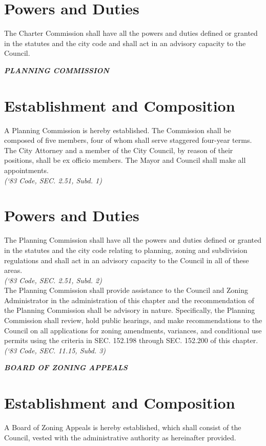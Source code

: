 \section{Powers and Duties}
The Charter Commission shall have all the powers and duties defined or granted in the statutes and the city code and shall act in an advisory capacity to the Council.\\

\centerline{\textbf{\emph{\LARGE{PLANNING COMMISSION}}}}
\setcounter{section}{119}
\section{Establishment and Composition}
A Planning Commission is hereby established.  The Commission shall be composed of five members, four of whom shall serve staggered four-year terms.  The City Attorney and a member of the City Council, by reason of their positions, shall be ex officio members.  The Mayor and Council shall make all appointments.\\
\emph{(‘83 Code, SEC. 2.51, Subd. 1)}
\section{Powers and Duties}
The Planning Commission shall have all the powers and duties defined or granted in the statutes and the city code relating to planning, zoning and subdivision regulations and shall act in an advisory capacity to the Council in all of these areas.\\
\emph{(‘83 Code, SEC. 2.51, Subd. 2)}\\
The Planning Commission shall provide assistance to the Council and Zoning Administrator in the administration of this chapter and the recommendation of the Planning Commission shall be advisory in nature. Specifically, the Planning Commission shall review, hold public hearings, and make recommendations to the Council on all applications for zoning amendments, variances, and conditional use permits using the criteria in SEC. 152.198 through SEC. 152.200 of this chapter.\\
\emph{(‘83 Code, SEC. 11.15, Subd. 3)}\\

\centerline{\textbf{\emph{\LARGE{BOARD OF ZONING APPEALS}}}}
\setcounter{section}{129}
\section{Establishment and Composition}
A Board of Zoning Appeals is hereby established, which shall consist of the Council, vested with the administrative authority as hereinafter provided.
